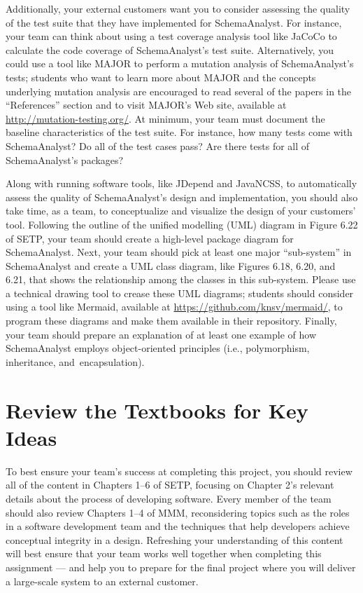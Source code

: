 Additionally, your external customers want you to consider assessing the quality of the test suite that they have
implemented for SchemaAnalyst. For instance, your team can think about using a test coverage analysis tool like JaCoCo
to calculate the code coverage of SchemaAnalyst's test suite. Alternatively, you could use a tool like MAJOR to perform
a mutation analysis of SchemaAnalyst's tests; students who want to learn more about MAJOR and the concepts underlying
mutation analysis are encouraged to read several of the papers in the ``References'' section and to visit MAJOR's Web
site, available at \url{http://mutation-testing.org/}. At minimum, your team must document the baseline characteristics
of the test suite. For instance, how many tests come with SchemaAnalyst? Do all of the test cases pass?  Are there tests
for all of SchemaAnalyst's packages?

Along with running software tools, like JDepend and JavaNCSS, to automatically assess the quality of SchemaAnalyst's
design and implementation, you should also take time, as a team, to conceptualize and visualize the design of your
customers' tool. Following the outline of the unified modelling (UML) diagram in Figure 6.22 of SETP, your team should
create a high-level package diagram for SchemaAnalyst. Next, your team should pick at least one major ``sub-system'' in
SchemaAnalyst and create a UML class diagram, like Figures 6.18, 6.20, and 6.21, that shows the relationship among the
classes in this sub-system. Please use a technical drawing tool to crease these UML diagrams; students should consider
using a tool like Mermaid, available at \url{https://github.com/knsv/mermaid/}, to program these diagrams and make them
available in their repository. Finally, your team should prepare an explanation of at least one example of how
SchemaAnalyst employs object-oriented principles (i.e., polymorphism, inheritance, \mbox{and encapsulation)}.


\section*{Review the Textbooks for Key Ideas}

To best ensure your team's success at completing this project, you should review all of the content in Chapters 1--6 of
SETP, focusing on Chapter 2's relevant details about the process of developing software. Every member of the team should
also review Chapters 1--4 of MMM, reconsidering topics such as the roles in a software development team and the
techniques that help developers achieve conceptual integrity in a design. Refreshing your understanding of this content
will best ensure that your team works well together when completing this assignment --- and help you to prepare for the
final project where you will deliver a large-scale system to an external customer.

